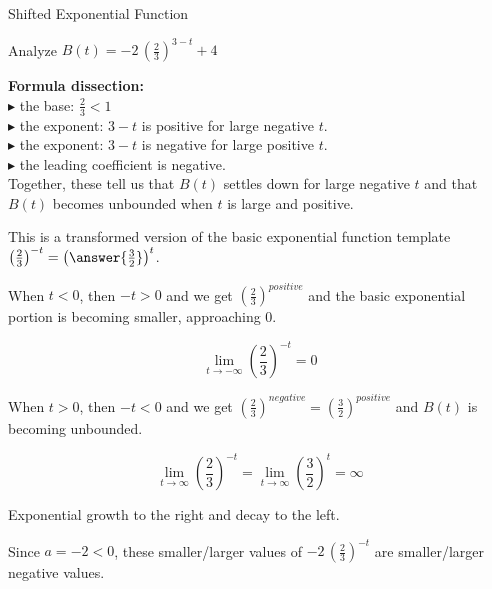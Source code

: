 \documentclass{ximera}
\begin{document}
\begin{example}  Shifted Exponential Function



Analyze   $B(t) = -2 \, \left( \frac{2}{3} \right)^{3-t} + 4$ \\


\begin{explanation}


\textbf{\textcolor{purple!85!blue}{Formula dissection:}}  \\


$\blacktriangleright$  the base: $\frac{2}{3} < 1$\\
$\blacktriangleright$  the exponent: $3-t$ is positive for large negative $t$. \\
$\blacktriangleright$  the exponent: $3-t$ is negative for large positive $t$. \\
$\blacktriangleright$  the leading coefficient is negative. \\


Together, these tell us that $B(t)$ settles down for large negative $t$ and that $B(t)$ becomes unbounded when $t$ is large and positive.



This is a transformed version of the basic exponential function template $\left( \frac{2}{3} \right)^{-t} = \left( \answer{\frac{3}{2}} \right)^t$.  



When $t < 0$, then $-t > 0$ and we get  $\left( \frac{2}{3} \right)^{positive}$ and the basic exponential portion is becoming smaller, approaching $0$.  





\[ \lim\limits_{t \to -\infty} \left( \frac{2}{3} \right)^{-t}  = 0 \]



When $t > 0$, then $-t < 0$ and we get  $\left( \frac{2}{3} \right)^{negative} = \left( \frac{3}{2} \right)^{positive}$ and $B(t)$ is becoming unbounded.  



\[ \lim\limits_{t \to \infty} \left( \frac{2}{3} \right)^{-t}  = \lim\limits_{t \to \infty} \left( \frac{3}{2} \right)^t  = \infty \]




Exponential growth to the right and decay to the left.






Since $a = -2 < 0$, these smaller/larger values of $-2 \, \left( \frac{2}{3} \right)^{-t}$ are smaller/larger negative values.




\end{explanation}
\end{example}
\end{document}
